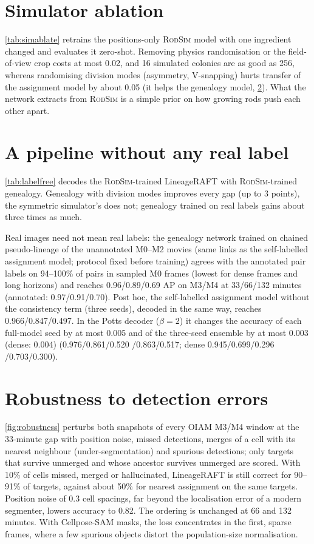 \documentclass[10pt,twocolumn,letterpaper]{article}
\newcommand{\ours}{LineageRAFT\xspace}
\newcommand{\rodsim}{\textsc{RodSim}\xspace}
\begin{document}
\section{Simulator ablation}
\cref{tab:simablate} retrains the positions-only \rodsim model with one ingredient changed and evaluates it zero-shot.
Removing physics randomisation or the field-of-view crop costs at most 0.02, and 16 simulated colonies are as good as 256, whereas randomising division modes (asymmetry, V-snapping) hurts transfer of the assignment model by about 0.05 (it helps the genealogy model, \cref{sec:supp-labelfree}).
What the network extracts from \rodsim is a simple prior on how growing rods push each other apart.


\section{A pipeline without any real label}
\label{sec:supp-labelfree}
\cref{tab:labelfree} decodes the \rodsim-trained \ours with \rodsim-trained genealogy.
Genealogy with division modes improves every gap (up to 3 points), the symmetric simulator's does not; genealogy trained on real labels gains about three times as much.

Real images need not mean real labels: the genealogy network trained on chained pseudo-lineage of the unannotated M0--M2 movies (same links as the self-labelled assignment model; protocol fixed before training) agrees with the annotated pair labels on 94--100\% of pairs in sampled M0 frames (lowest for dense frames and long horizons) and reaches 0.96/0.89/0.69 AP on M3/M4 at 33/66/132 minutes (annotated: 0.97/0.91/0.70). Post hoc, the self-labelled assignment model without the consistency term (three seeds), decoded in the same way, reaches 0.966/0.847/0.497.
In the Potts decoder ($\beta{=}2$) it changes the accuracy of each full-model seed by at most 0.005 and of the three-seed ensemble by at most 0.003 (dense: 0.004) (0.976/0.861/0.520 /0.863/0.517; dense 0.945/0.699/0.296 /0.703/0.300).

\section{Robustness to detection errors}
\cref{fig:robustness} perturbs both snapshots of every OIAM M3/M4 window at the 33-minute gap with position noise, missed detections, merges of a cell with its nearest neighbour (under-segmentation) and spurious detections; only targets that survive unmerged and whose ancestor survives unmerged are scored.
With 10\% of cells missed, merged or hallucinated, \ours is still correct for 90--91\% of targets, against about 50\% for nearest assignment on the same targets.
Position noise of $0.3$ cell spacings, far beyond the localisation error of a modern segmenter, lowers accuracy to 0.82.
The ordering is unchanged at 66 and 132 minutes.
With Cellpose-SAM masks, the loss concentrates in the first, sparse frames, where a few spurious objects distort the population-size normalisation.
\end{document}
